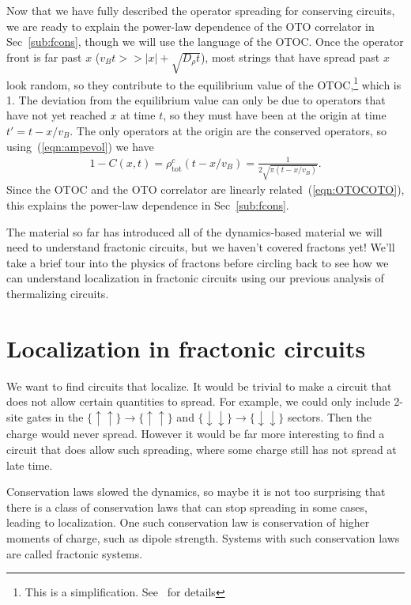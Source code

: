 \documentclass[a4paper,11pt]{article}
\renewcommand{\th}[1]{\frac{1}{#1}}
\newcommand{\abs}[1]{\left| #1 \right|}
\newcommand{\tot}{\text{tot}}
\begin{document}
Now that we have fully described the operator spreading for conserving circuits, we are ready to explain the power-law dependence of the OTO correlator in Sec~\ref{sub:fcons}, though we will use the language of the OTOC.
Once the operator front is far past $x$ ($v_Bt>>\abs{x}+\sqrt{D_\rho t}$), most strings that have spread past $x$ look random, so they contribute to the equilibrium value of the OTOC,\footnote{This is a simplification. See~\cite{KhemaniOpSp} for details} which is 1. The deviation from the equilibrium value can only be due to operators that have not yet reached $x$ at time $t$, so they must have been at the origin at time $t'=t-x/v_B$. The only operators at the origin are the conserved operators, so using~(\ref{eqn:ampevol}) we have
\begin{align}
1-C(x,t) = \rho^c_\tot(t-x/v_B) = \th{2\sqrt{\pi(t-x/v_B)}}.
\end{align}
Since the OTOC and the OTO correlator are linearly related~(\ref{eqn:OTOCOTO}), this explains the power-law dependence in Sec~\ref{sub:fcons}.

The material so far has introduced all of the dynamics-based material we will need to understand fractonic circuits, but we haven't covered fractons yet! We'll take a brief tour into the physics of fractons before circling back to see how we can understand localization in fractonic circuits using our previous analysis of thermalizing circuits.


\section{Localization in fractonic circuits} \label{sec:fraccirc}

We want to find circuits that localize. It would be trivial to make a circuit that does not allow certain quantities to spread. For example, we could only include 2-site gates in the $\{\uparrow\uparrow\}\to\{\uparrow\uparrow\}$ and $\{\downarrow\downarrow\}\to\{\downarrow\downarrow\}$ sectors. Then the charge would never spread. However it would be far more interesting to find a circuit that does allow such spreading, where some charge still has not spread at late time.

Conservation laws slowed the dynamics, so maybe it is not too surprising that there is a class of conservation laws that can stop spreading in some cases, leading to localization. One such conservation law is conservation of higher moments of charge, such as dipole strength. Systems with such conservation laws are called fractonic systems.
\end{document}
